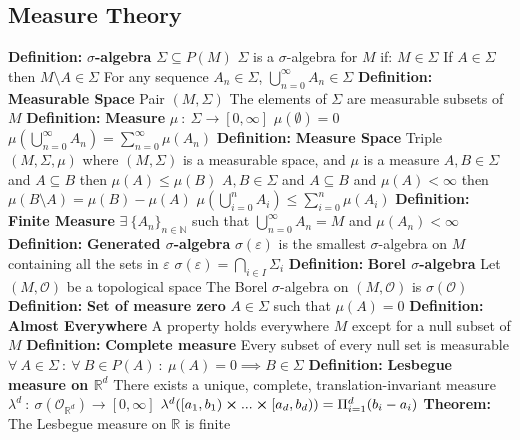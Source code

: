 \documentclass[14pt]{extarticle}
\def\Definition{{\color{blue} \textbf{Definition:} }}
\def\Theorem{{\color{red} \textbf{Theorem:} }}
\begin{document}
\begin{outline}
	\section*{Measure Theory}
		\1	\Definition \textbf{$\sigma$-algebra}
			\2	$\Sigma \subseteq P(M)$
			\2	$\Sigma$ is a $\sigma$-algebra for $M$ if:
				\3	$M \in \Sigma$
				\3	If $A \in \Sigma$ then $M \setminus A \in \Sigma$
				\3	For any sequence $A_n \in \Sigma$, $\bigcup_{n=0}^{\infty}A_n \in \Sigma$
		\1	\Definition \textbf{Measurable Space}
			\2	Pair $(M,\Sigma)$ 
			\2	The elements of $\Sigma$ are measurable subsets of $M$
		\1	\Definition \textbf{Measure}
			\2	$\mu~:~\Sigma \rightarrow [0,\infty]$
			\2	$\mu(\emptyset) = 0$
			\2	$\mu(\bigcup_{n=0}^{\infty}A_n) = \sum_{n=0}^{\infty}\mu(A_n)$
		\1	\Definition \textbf{Measure Space}
			\2	Triple $(M,\Sigma,\mu)$ where $(M,\Sigma)$ is a measurable space, and
					$\mu$ is a measure
			\2	$A,B \in \Sigma$ and $A \subseteq B$ then $\mu(A) \le \mu(B)$
			\2	$A,B \in \Sigma$ and $A \subseteq B$ and $\mu(A) < \infty$ then
					$\mu(B \setminus A) = \mu(B) - \mu(A)$
			\2	$\mu(\bigcup_{i=0}^{n}A_i) \le \sum_{i=0}^{n}\mu(A_i)$
			\2	\Definition \textbf{Finite Measure}
				\3	$\exists~\{A_n\}_{n \in \mathbb{N}}$ such that
						$\bigcup_{n=0}^{\infty}A_n = M$ and $\mu(A_n) < \infty$
		\1	\Definition \textbf{Generated $\sigma$-algebra}
			\2	$\sigma(\varepsilon)$ is the smallest $\sigma$-algebra on $M$ containing
					all the sets in $\varepsilon$
			\2	$\sigma(\varepsilon) = \bigcap_{i \in I} \Sigma_i$
		\1	\Definition \textbf{Borel $\sigma$-algebra}
			\2	Let $(M,\mathcal{O})$ be a topological space
			\2	The Borel $\sigma$-algebra on $(M,\mathcal{O})$ is $\sigma(\mathcal{O})$
		\1	\Definition \textbf{Set of measure zero}
			\2	$A \in \Sigma$ such that $\mu(A) = 0$
		\1	\Definition \textbf{Almost Everywhere}
			\2	A property holds everywhere $M$ except for a null subset of $M$
		\1	\Definition \textbf{Complete measure}
			\2	Every subset of every null set is measurable
			\2	$\forall~A \in \Sigma~:~\forall~B \in P(A)~:~\mu(A) = 0 \implies B \in \Sigma$
		\1	\Definition \textbf{Lesbegue measure on $\mathbb{R}^d$}
			\2	There exists a unique, complete, translation-invariant measure 
					$\lambda^d~:~\sigma(\mathcal{O}_{\mathbb{R}^d}) \rightarrow [0,\infty]$
			\2	$\lambda^d([a_1,b_1) \cross ... \cross [a_d,b_d)) = \Pi_{i=1}^d(b_i - a_i)$
		\1	\Theorem The Lesbegue measure on $\mathbb{R}$ is finite
	

\end{outline}
\end{document}
